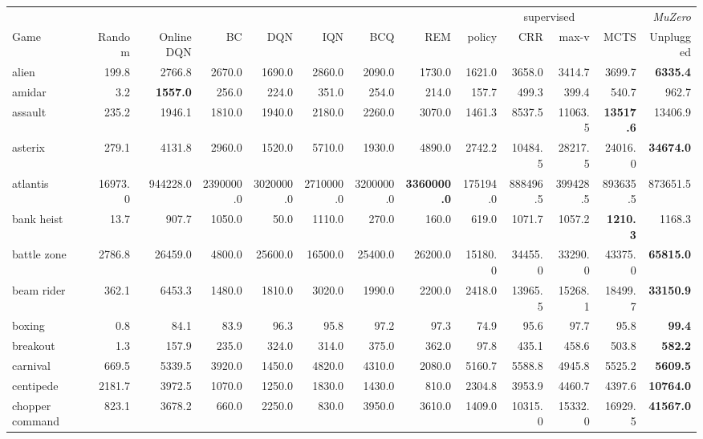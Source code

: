 \documentclass{article}
\newcommand{\muzero}{\emph{MuZero}}
\begin{document}
\begin{table}
\tiny

\begin{center}\begin{tabularx}{1.05\textwidth}{X|rr|rrrrr|rrrr|r}
\toprule
 &  &  &  &  &  &  &  & \multicolumn{4}{c|}{supervised} & \muzero{} \\
Game & Random & Online DQN & BC & DQN & IQN & BCQ & REM & policy & CRR & max-v & MCTS & Unplugged \\
\midrule
alien  & 199.8 & 2766.8 & 2670.0 & 1690.0 & 2860.0 & 2090.0 & 1730.0 & 1621.0 & 3658.0 & 3414.7 & 3699.7 & \textbf{6335.4} \\
amidar  & 3.2 & \textbf{1557.0} & 256.0 & 224.0 & 351.0 & 254.0 & 214.0 & 157.7 & 499.3 & 399.4 & 540.7 & 962.7 \\
assault  & 235.2 & 1946.1 & 1810.0 & 1940.0 & 2180.0 & 2260.0 & 3070.0 & 1461.3 & 8537.5 & 11063.5 & \textbf{13517.6} & 13406.9 \\
asterix  & 279.1 & 4131.8 & 2960.0 & 1520.0 & 5710.0 & 1930.0 & 4890.0 & 2742.2 & 10484.5 & 28217.5 & 24016.0 & \textbf{34674.0} \\
atlantis  & 16973.0 & 944228.0 & 2390000.0 & 3020000.0 & 2710000.0 & 3200000.0 & \textbf{3360000.0} & 175194.0 & 888496.5 & 399428.5 & 893635.5 & 873651.5 \\
bank heist  & 13.7 & 907.7 & 1050.0 & 50.0 & 1110.0 & 270.0 & 160.0 & 619.0 & 1071.7 & 1057.2 & \textbf{1210.3} & 1168.3 \\
battle zone  & 2786.8 & 26459.0 & 4800.0 & 25600.0 & 16500.0 & 25400.0 & 26200.0 & 15180.0 & 34455.0 & 33290.0 & 43375.0 & \textbf{65815.0} \\
beam rider  & 362.1 & 6453.3 & 1480.0 & 1810.0 & 3020.0 & 1990.0 & 2200.0 & 2418.0 & 13965.5 & 15268.1 & 18499.7 & \textbf{33150.9} \\
boxing  & 0.8 & 84.1 & 83.9 & 96.3 & 95.8 & 97.2 & 97.3 & 74.9 & 95.6 & 97.7 & 95.8 & \textbf{99.4} \\
breakout  & 1.3 & 157.9 & 235.0 & 324.0 & 314.0 & 375.0 & 362.0 & 97.8 & 435.1 & 458.6 & 503.8 & \textbf{582.2} \\
carnival  & 669.5 & 5339.5 & 3920.0 & 1450.0 & 4820.0 & 4310.0 & 2080.0 & 5160.7 & 5588.8 & 4945.8 & 5525.2 & \textbf{5609.5} \\
centipede  & 2181.7 & 3972.5 & 1070.0 & 1250.0 & 1830.0 & 1430.0 & 810.0 & 2304.8 & 3953.9 & 4460.7 & 4397.6 & \textbf{10764.0} \\
chopper command  & 823.1 & 3678.2 & 660.0 & 2250.0 & 830.0 & 3950.0 & 3610.0 & 1409.0 & 10315.0 & 15332.0 & 16929.5 & \textbf{41567.0} \\

\end{tabularx}
\end{center}
\end{table}
\end{document}
